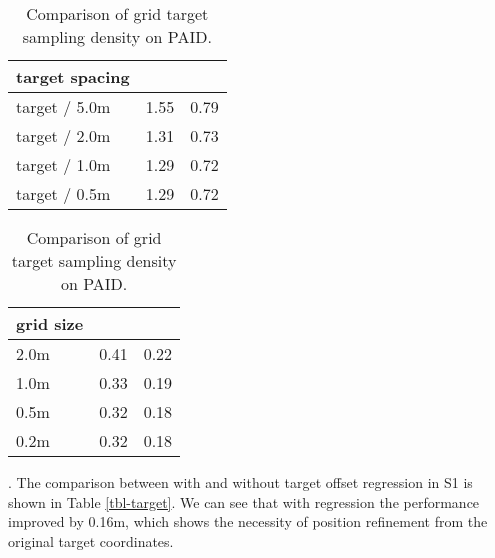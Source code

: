 \documentclass{article}
\begin{document}
\begin{table}[h]
    \centering
    \begin{minipage}{.4\linewidth}
\caption{Comparison of map target sampling density on Argoverse dataset.}
    \label{tbl-vehicle-target}
    \centering
    \begin{tabular}{l|c|c}
    \toprule
        target spacing &  &  \\ \midrule
target / 5.0m  &   1.55  &  0.79  \\ 
target / 2.0m  &   1.31  &  0.73  \\ 
target / 1.0m  &   1.29  &  0.72  \\ 
target / 0.5m &  1.29 &  0.72   \\ \bottomrule
    \end{tabular}
    \end{minipage}
    \hspace{0.5in}
    \begin{minipage}{.4\linewidth}
    \caption{Comparison of grid target sampling density on PAID.}
    \label{tbl-ped-target}
    \centering
    \begin{tabular}{l|c|c}
    \toprule
        grid size &  &  \\ \midrule
        2.0m   & 0.41    &  0.22  \\ 
        1.0m &  0.33  &   0.19  \\ 
        0.5m & 0.32  &  0.18  \\ 
        0.2m &  0.32 & 0.18    \\ \bottomrule
    \end{tabular}
    \end{minipage}
\end{table}

. The comparison between with and without target offset regression in S1 is shown in Table \ref{tbl-target}. We can see that with regression the performance improved by 0.16m, which shows the necessity of position refinement from the original target coordinates. 
\end{document}
